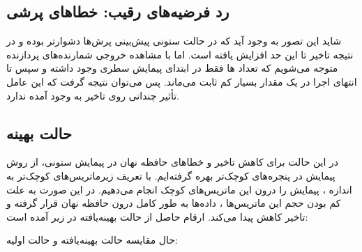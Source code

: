 \documentclass{article}
\begin{document}
\subsection{رد فرضیه‌های رقیب: خطاهای پرشی}
شاید این تصور به وجود آید که در حالت ستونی پیش‌بینی پرش‌ها دشوارتر بوده و در نتیجه تاخیر تا این حد افزایش یافته است. اما با مشاهده خروجی شمارنده‌های پردازنده متوجه می‌شویم که تعداد ها فقط در ابتدای پیمایش سطری وجود داشته و سپس تا انتهای اجرا در یک مقدار بسیار کم ثابت می‌ماند. پس می‌توان نتیجه گرفت که این عامل تأثیر چندانی روی تاخیر به وجود آمده ندارد.


\subsection{حالت بهینه}
در این حالت برای کاهش تاخیر و خطاهای حافظه نهان در پیمایش ستونی، از روش پیمایش در پنجره‌های کوچک‌تر  بهره گرفته‌ایم. با تعریف زیرماتریس‌های کوچک‌تر به اندازه ، پیمایش را درون این ماتریس‌های کوچک انجام می‌دهیم. در این صورت به علت کم بودن حجم این ماتریس‌ها ، داده‌ها به طور کامل درون حافظه نهان قرار گرفته و تاخیر کاهش پیدا می‌کند. ارقام حاصل از حالت بهینه‌یافته در زیر آمده است:


\begin{latin}
\begin{table}[htbp]
	\centering
	\caption{Hardware Counters - Optimized}
	\label{tab:hardware_counters_optimized}
\end{table}
\end{latin}

\FloatBarrier


حال مقایسه حالت بهینه‌یافته و حالت اولیه:
\end{document}
